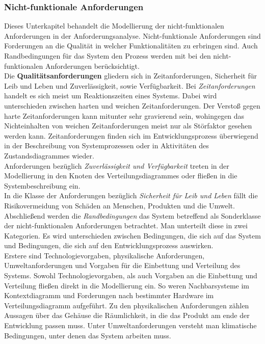 \documentclass[../Bachelorarbeit.tex]{subfiles}
\begin{document}

\subsubsection{Nicht-funktionale Anforderungen}
Dieses Unterkapitel behandelt die Modellierung der nicht-funktionalen Anforderungen in der Anforderungsanalyse. Nicht-funktionale Anforderungen sind Forderungen an die Qualität in welcher Funktionalitäten zu erbringen sind. Auch Randbedingungen für das System \bzw den Prozess werden mit bei den nicht-funktionalen Anforderungen berücksichtigt.\\ %
Die \textbf{Qualitätsanforderungen} gliedern sich in Zeitanforderungen, Sicherheit für Leib und Leben und Zuverlässigkeit, sowie Verfügbarkeit. Bei \textit{Zeitanforderungen} handelt es sich meist um Reaktionszeiten eines Systems. Dabei wird unterschieden zwischen harten und weichen Zeitanforderungen. Der Verstoß gegen harte Zeitanforderungen kann mitunter sehr gravierend sein, wohingegen das Nichteinhalten von weichen Zeitanforderungen meist nur als Störfaktor gesehen werden kann. Zeitanforderungen finden sich im Entwicklungsprozess überwiegend in der Beschreibung von Systemprozessen oder in Aktivitäten des Zustandsdiagrammes wieder.\\
Anforderungen bezüglich \textit{Zuverlässigkeit und Verfügbarkeit} treten in der Modellierung in den Knoten des Verteilungsdiagrammes oder fließen in die Systembeschreibung ein.\\
In die Klasse der Anforderungen bezüglich \textit{Sicherheit für Leib und Leben} fällt die Risikovermeidung von Schäden an Menschen, Produkten und die Umwelt.\\
Abschließend werden die \textit{Randbedingungen} das System betreffend als Sonderklasse der nicht-funktionalen Anforderungen betrachtet. Man unterteilt diese in zwei Kategorien. Es wird unterschieden zwischen Bedingungen, die sich auf das System und Bedingungen, die sich auf den Entwicklungsprozess auswirken.\\
Erstere sind Technologievorgaben, physikalische Anforderungen, Umweltanforderungen und Vorgaben für die Einbettung und Verteilung des Systems. Sowohl Technologievorgaben, als auch Vorgaben an die Einbettung und Verteilung fließen direkt in die Modellierung ein. So weren \bspw Nachbarsysteme im Kontextdiagramm und Forderungen nach bestimmter Hardware im Verteilungsdiagramm aufgeführt. Zu den physikalischen Anforderungen zählen \zB Aussagen über das Gehäuse \bzw die Räumlichkeit, in die das Produkt am ende der Entwicklung passen muss. Unter Umweltanforderungen versteht man \bspw klimatische Bedingungen, unter denen das System arbeiten muss.\\
\end{document}
